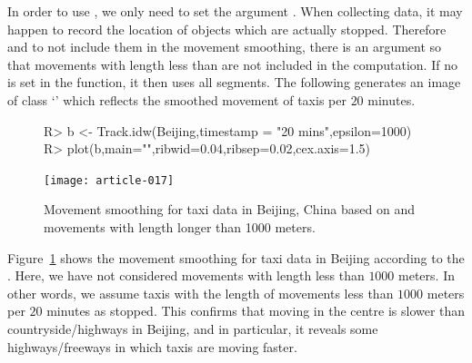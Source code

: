 \documentclass[article]{jss}
\newcommand{\class}[1]{`\code{#1}'}
\begin{document}
  In order to use , we only need to set the argument . When collecting data, it may happen to record the location of objects which are actually stopped. Therefore and to not include them in the movement smoothing, there is an argument  so that movements with length less than  are not included in the computation. If no  is set in the function, it then uses all segments. 
  The following  generates an image of class \class{im} which reflects the smoothed movement of taxis per $20$ minutes.
\begin{figure}[!h]
\begin{center}
\begin{Sinput}
R> b <- Track.idw(Beijing,timestamp = "20 mins",epsilon=1000)
R> plot(b,main="",ribwid=0.04,ribsep=0.02,cex.axis=1.5)
\end{Sinput}
\texttt{[image: article-017]}
\end{center}
\caption{Movement smoothing for taxi data in Beijing, China based on  and movements with length longer than 1000 meters.}
\label{idwBeijing}
\end{figure}

  Figure~\ref{idwBeijing} shows the movement smoothing for taxi data in Beijing according to the . Here, we have not considered movements with length less than $1000$ meters. In other words, we assume taxis with the length of movements less than $1000$ meters per $20$ minutes as stopped. This confirms that moving in the centre is slower than countryside/highways in Beijing, and in particular, it reveals some highways/freeways in which taxis are moving faster.
\end{document}
